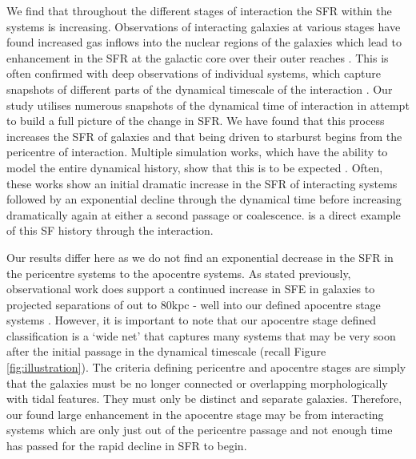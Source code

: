 We find that throughout the different stages of interaction the SFR within the systems is increasing. Observations of interacting galaxies at various stages have found increased gas inflows into the nuclear regions of the galaxies which lead to enhancement in the SFR at the galactic core over their outer reaches \citep{2015A&A...579A..45B}. This is often confirmed with deep observations of individual systems, which capture snapshots of different parts of the dynamical timescale of the interaction \citep{2022MNRAS.514.2769K}. Our study utilises numerous snapshots of the dynamical time of interaction in attempt to build a full picture of the change in SFR. We have found that this process increases the SFR of galaxies and that being driven to starburst begins from the pericentre of interaction. Multiple simulation works, which have the ability to model the entire dynamical history, show that this is to be expected \citep{2007A&A...468...61D, 2013MNRAS.430.1901H, 2015MNRAS.452.2984K, 2021MNRAS.503.3113M}. Often, these works show an initial dramatic increase in the SFR of interacting systems followed by an exponential decline through the dynamical time before increasing dramatically again at either a second passage or coalescence. \citet{2015MNRAS.448.1107M} is a direct example of this SF history through the interaction.

Our results differ here as we do not find an exponential decrease in the SFR in the pericentre systems to the apocentre systems. As stated previously, observational work does support a continued increase in SFE in galaxies to projected separations of out to 80kpc - well into our defined apocentre stage systems \citep[for further examples, see][]{2008MNRAS.385.1903L, 2012MNRAS.426..549S}. However, it is important to note that our apocentre stage defined classification is a `wide net' that captures many systems that may be very soon after the initial passage in the dynamical timescale (recall Figure \ref{fig:illustration}). The criteria defining pericentre and apocentre stages are simply that the galaxies must be no longer connected or overlapping morphologically with tidal features. They must only be distinct and separate galaxies. Therefore, our found large enhancement in the apocentre stage may be from interacting systems which are only just out of the pericentre passage and not enough time has passed for the rapid decline in SFR to begin. 

